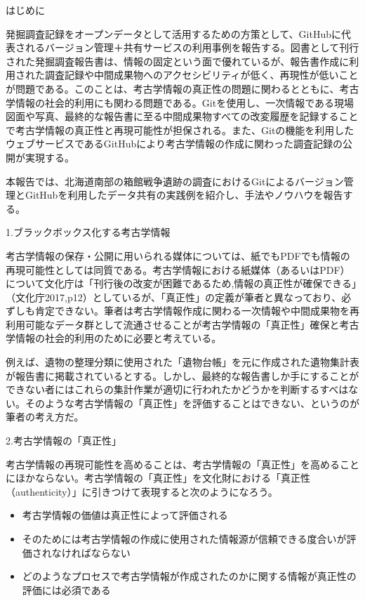 \documentclass[9pt,b5j,papersize]{jsarticle}
\begin{document}
\begin{multicols}{2}

\noindent
{\large はじめに}

発掘調査記録をオープンデータとして活用するための方策として、GitHubに代表されるバージョン管理＋共有サービスの利用事例を報告する。図書として刊行された発掘調査報告書は、情報の固定という面で優れているが、報告書作成に利用された調査記録や中間成果物へのアクセシビリティが低く、再現性が低いことが問題である。このことは、考古学情報の真正性の問題に関わるとともに、考古学情報の社会的利用にも関わる問題である。Gitを使用し、一次情報である現場図面や写真、最終的な報告書に至る中間成果物すべての改変履歴を記録することで考古学情報の真正性と再現可能性が担保される。また、Gitの機能を利用したウェブサービスであるGitHubにより考古学情報の作成に関わった調査記録の公開が実現する。

本報告では、北海道南部の箱館戦争遺跡の調査におけるGitによるバージョン管理とGitHubを利用したデータ共有の実践例を紹介し、手法やノウハウを報告する。

\noindent
{\large 1.ブラックボックス化する考古学情報}

考古学情報の保存・公開に用いられる媒体については、紙でもPDFでも情報の再現可能性としては同質である。考古学情報における紙媒体（あるいはPDF）について文化庁は「刊行後の改変が困難であるため,情報の真正性が確保できる」（文化庁2017,p12）としているが、「真正性」の定義が筆者と異なっており、必ずしも肯定できない。筆者は考古学情報作成に関わる一次情報や中間成果物を再利用可能なデータ群として流通させることが考古学情報の「真正性」確保と考古学情報の社会的利用のために必要と考えている。

例えば、遺物の整理分類に使用された「遺物台帳」を元に作成された遺物集計表が報告書に掲載されているとする。しかし、最終的な報告書しか手にすることができない者にはこれらの集計作業が適切に行われたかどうかを判断するすべはない。そのような考古学情報の「真正性」を評価することはできない、というのが筆者の考え方だ。

\noindent
{\large 2.考古学情報の「真正性」}

考古学情報の再現可能性を高めることは、考古学情報の「真正性」を高めることにほかならない。考古学情報の「真正性」を文化財における「真正性（authenticity）」に引きつけて表現すると次のようになろう。

\begin{itemize}
\item 考古学情報の価値は真正性によって評価される
\item そのためには考古学情報の作成に使用された情報源が信頼できる度合いが評価されなければならない
\item どのようなプロセスで考古学情報が作成されたのかに関する情報が真正性の評価には必須である
\end{itemize}


\end{multicols}
\end{document}
